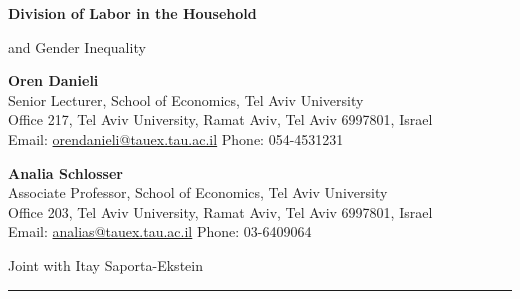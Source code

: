 \documentclass[12pt]{article}
\newcommand{\hebrewtitle}{}
\newcommand{\hebrewnameoren}{}
\newcommand{\hebrewnameanalia}{}
\newcommand{\hebrewtitle}{\par\vspace{0.25em}{\large\texthebrew{חלוקת העבודה במשק הבית ואי שוויון מגדרי}}\par}
\newcommand{\hebrewnameoren}{\texthebrew{אורן דניאלי}}
\newcommand{\hebrewnameanalia}{\texthebrew{אנליה שלוסר}}
\begin{document}
\begin{center}
{\Large\bfseries
Division of Labor in the Household\par
and Gender Inequality
\hebrewtitle
}    
\end{center}


\textbf{Oren Danieli \hebrewnameoren}\\
Senior Lecturer, School of Economics, Tel Aviv University\\
Office 217, Tel Aviv University, Ramat Aviv, Tel Aviv 6997801, Israel\\
Email: \href{mailto:orendanieli@tauex.tau.ac.il}{orendanieli@tauex.tau.ac.il} \quad Phone: 054-4531231

\medskip

\textbf{Analia Schlosser \hebrewnameanalia}\\
Associate Professor, School of Economics, Tel Aviv University\\
Office 203, Tel Aviv University, Ramat Aviv, Tel Aviv 6997801, Israel\\
Email: \href{mailto:analias@tauex.tau.ac.il}{analias@tauex.tau.ac.il} \quad Phone: 03-6409064

\medskip

Joint with Itay Saporta-Ekstein

\vspace{0.8em}
\hrule
\vspace{0.8em}

\begin{abstract}
Gender gaps in earnings and careers remain a central economic and social problem. A central hypothesis is that the division of labor inside the household is the primary cause of those gaps. This project studies whether temporary shocks to household specialization when children are young, at the beginning of parenthood, can durably change the later division of labor within the household, and whether such changes have causal effects on gender gaps in labor market outcomes and parents' career trajectories. We exploit exogenous variation created by the COVID-19 pandemic, which sharply changed the allocation of paid work and caregiving across couples depending on the pre-pandemic sectors and occupations in which mothers and fathers were employed. In some households, mothers continued to work outside the home because they were employed in essential sectors such as health services, banking, or utilities, while fathers stayed home because their sectors were shut down or moved largely to remote work. We study these shocks using linked Israeli administrative data together with panel and time use survey information from the UK Household Longitudinal Study and the German Socio-Economic Panel. We will use a difference-in-differences event study design that determines treatment status based on the pre-COVID sector exposure to COVID regulations. 
\end{abstract}
\end{document}
